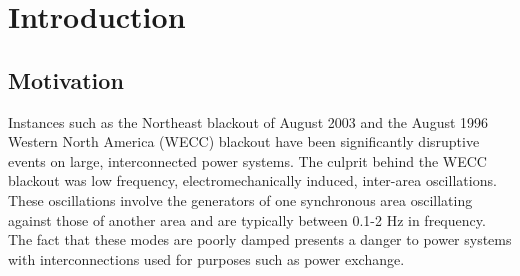\documentclass[conference]{IEEEtran}
\begin{document}
\section{Introduction}
\subsection{Motivation}
Instances such as the Northeast blackout of August 2003 and the August 1996 Western North America (WECC)\cite{NAERC} blackout have been significantly disruptive events on large, interconnected power systems. The culprit behind the WECC blackout was low frequency, electromechanically induced, inter-area oscillations\cite{NAERC}. These oscillations involve the generators of one synchronous area oscillating against those of another area and are typically between 0.1-2 Hz in frequency. The fact that these modes are poorly damped\cite{WAPODNorway} presents a danger to power systems with interconnections used for purposes such as power exchange.
\end{document}
